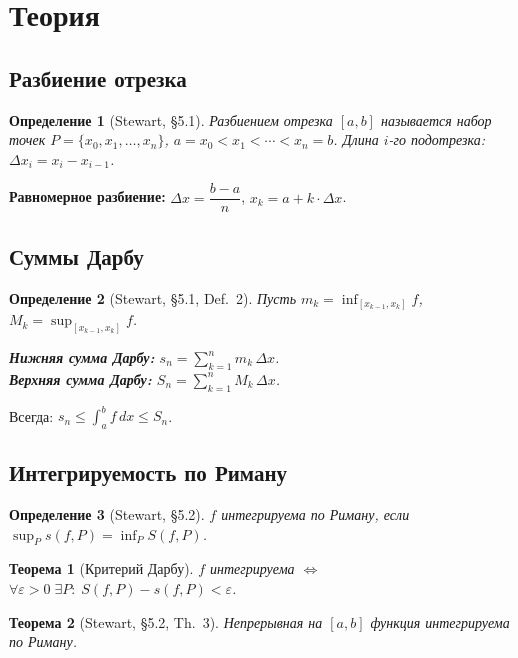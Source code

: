 \documentclass[12pt,a4paper]{article}
\newtheorem{theorem}{Теорема}
\newtheorem{definition}{Определение}
\begin{document}
\section{Теория}
\subsection{Разбиение отрезка}
\begin{definition}[Stewart, \S 5.1]
\emph{Разбиением} отрезка $[a,b]$ называется набор точек
$P=\{x_0,x_1,\ldots,x_n\}$, $a=x_0<x_1<\cdots<x_n=b$.
Длина $i$-го подотрезка: $\Delta x_i=x_i-x_{i-1}$.
\end{definition}

\noindent\textbf{Равномерное разбиение:}
$\Delta x=\dfrac{b-a}{n}$, $x_k=a+k\cdot\Delta x$.

\subsection{Суммы Дарбу}
\begin{definition}[Stewart, \S 5.1, Def.~2]
Пусть $m_k=\inf_{[x_{k-1},x_k]}f$, $M_k=\sup_{[x_{k-1},x_k]}f$.

\textbf{Нижняя сумма Дарбу:}\;
$s_n = \displaystyle\sum_{k=1}^{n}m_k\,\Delta x$.\\[4pt]
\textbf{Верхняя сумма Дарбу:}\;
$S_n = \displaystyle\sum_{k=1}^{n}M_k\,\Delta x$.
\end{definition}

Всегда: $s_n\leq\int_a^b f\,dx\leq S_n$.

\subsection{Интегрируемость по Риману}
\begin{definition}[Stewart, \S 5.2]
$f$ \emph{интегрируема по Риману}, если
$\sup_P s(f,P)=\inf_P S(f,P)$.
\end{definition}

\begin{theorem}[Критерий Дарбу]
$f$ интегрируема $\Leftrightarrow$ $\forall\varepsilon>0\;\exists P:\;S(f,P)-s(f,P)<\varepsilon$.
\end{theorem}

\begin{theorem}[Stewart, \S 5.2, Th.~3]
Непрерывная на $[a,b]$ функция интегрируема по Риману.
\end{theorem}
\end{document}
